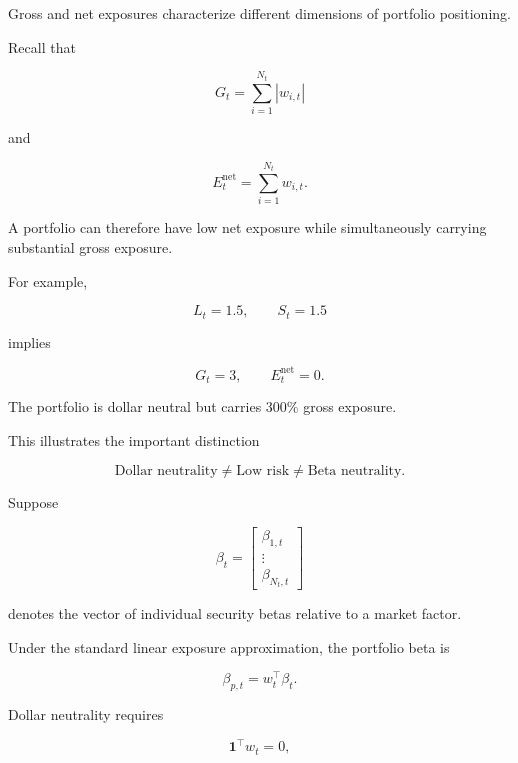 \documentclass[11pt,a4paper]{article}
\begin{document}
Gross and net exposures characterize different dimensions of portfolio
positioning.

Recall that

\begin{equation}
G_t
=
\sum_{i=1}^{N_t}
|w_{i,t}|
\end{equation}

and

\begin{equation}
E_t^{\mathrm{net}}
=
\sum_{i=1}^{N_t}
w_{i,t}.
\end{equation}

A portfolio can therefore have low net exposure while simultaneously carrying
substantial gross exposure.

For example,

\begin{equation}
L_t=1.5,
\qquad
S_t=1.5
\end{equation}

implies

\begin{equation}
G_t=3,
\qquad
E_t^{\mathrm{net}}=0.
\end{equation}

The portfolio is dollar neutral but carries $300\%$ gross exposure.

This illustrates the important distinction

\begin{equation}
\boxed{
\text{Dollar neutrality}
\neq
\text{Low risk}
\neq
\text{Beta neutrality}.
}
\end{equation}

Suppose

\begin{equation}
\beta_t
=
\begin{bmatrix}
\beta_{1,t}\\
\vdots\\
\beta_{N_t,t}
\end{bmatrix}
\end{equation}

denotes the vector of individual security betas relative to a market factor.

Under the standard linear exposure approximation, the portfolio beta is

\begin{equation}
\boxed{
\beta_{p,t}
=
w_t^\top\beta_t.
}
\end{equation}

Dollar neutrality requires

\begin{equation}
\mathbf{1}^\top w_t
=
0,
\end{equation}
\end{document}
